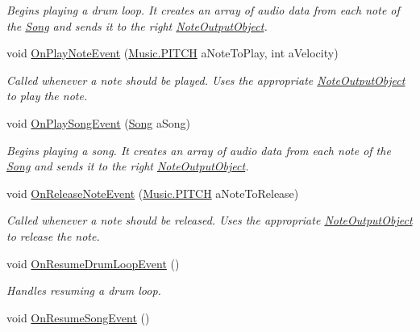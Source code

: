 \begin{DoxyCompactItemize}
\begin{DoxyCompactList}\small\item\em Begins playing a drum loop. It creates an array of audio data from each note of the \hyperlink{class_song}{Song} and sends it to the right \hyperlink{class_note_output_object}{Note\+Output\+Object}. \end{DoxyCompactList}\item 
void \hyperlink{group___v_i_m_handlers_ga80b3821df3b1488a150f6062638f105c}{On\+Play\+Note\+Event} (\hyperlink{group___music_enums_ga508f69b199ea518f935486c990edac1d}{Music.\+P\+I\+T\+CH} a\+Note\+To\+Play, int a\+Velocity)
\begin{DoxyCompactList}\small\item\em Called whenever a note should be played. Uses the appropriate \hyperlink{class_note_output_object}{Note\+Output\+Object} to play the note. \end{DoxyCompactList}\item 
void \hyperlink{group___v_i_m_handlers_ga7fd877a7d429403abbfd2728aa63c056}{On\+Play\+Song\+Event} (\hyperlink{class_song}{Song} a\+Song)
\begin{DoxyCompactList}\small\item\em Begins playing a song. It creates an array of audio data from each note of the \hyperlink{class_song}{Song} and sends it to the right \hyperlink{class_note_output_object}{Note\+Output\+Object}. \end{DoxyCompactList}\item 
void \hyperlink{group___v_i_m_handlers_ga0f0a34c251d154131f9ea130a54dc989}{On\+Release\+Note\+Event} (\hyperlink{group___music_enums_ga508f69b199ea518f935486c990edac1d}{Music.\+P\+I\+T\+CH} a\+Note\+To\+Release)
\begin{DoxyCompactList}\small\item\em Called whenever a note should be released. Uses the appropriate \hyperlink{class_note_output_object}{Note\+Output\+Object} to release the note. \end{DoxyCompactList}\item 
void \hyperlink{group___v_i_m_handlers_ga97e3e73e05a7ab6027f25573712367a2}{On\+Resume\+Drum\+Loop\+Event} ()
\begin{DoxyCompactList}\small\item\em Handles resuming a drum loop. \end{DoxyCompactList}\item 
void \hyperlink{group___v_i_m_handlers_gaca3d2c89672fe0eb3d94b3cb2072de59}{On\+Resume\+Song\+Event} ()

\end{DoxyCompactItemize}
